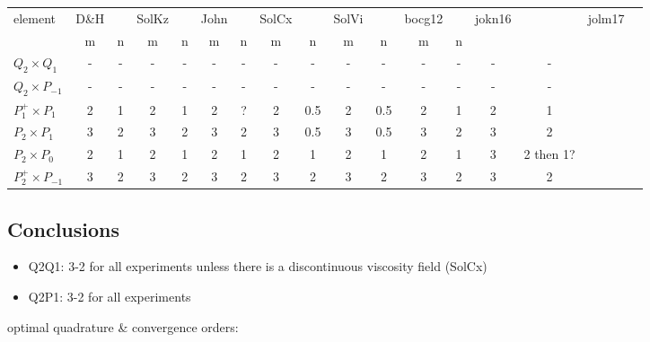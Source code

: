 \begin{footnotesize}
\begin{center}
\begin{tabular}{|l|cc|cc|cc|cc|cc|cc|cc|cc|}
\hline
element          & D\&H && SolKz  &&  John  && SolCx &&  SolVi && bocg12&&jokn16 &&jolm17 & \\
                      & m&n& m&n& m&n& m&n& m&n& m&n \\
\hline
$Q_2\times Q_1$       &  -&- & -&- &  -&- &  -&-   & -&-&-&-&-&-\\
$Q_2\times P_{-1}$    &  -&- & -&- &  -&- &  -&-   & -&-&-&-&-&-\\
$P_1^+\times P_{1}$   &  2&1 & 2&1 &  2&? &  2&0.5 & 2&0.5 &2&1 & 2&1  \\
$P_2\times P_1$       &  3&2 & 3&2 &  3&2 &  3&0.5 & 3&0.5 &3&2 & 3&2   \\
$P_2\times P_0$       &  2&1 & 2&1 &  2&1 &  2&1   & 2&1   &2&1 & 3&2 then 1?  \\
$P_2^+\times P_{-1}$  &  3&2 & 3&2 &  3&2 &  3&2   & 3&2   &3&2 & 3&2  \\
\hline
\end{tabular}
\end{center}
\end{footnotesize}

\subsection*{Conclusions}

\begin{itemize}
\item Q2Q1: 3-2 for all experiments unless there is a discontinuous viscosity field (SolCx)
\item Q2P1: 3-2 for all experiments
\end{itemize}








\newpage
optimal quadrature \& convergence orders:

